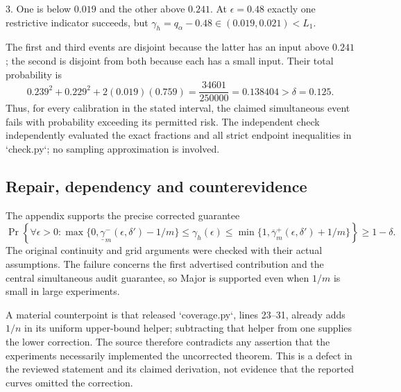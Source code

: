 \documentclass[10pt]{article}
\begin{document}
3. One is below \(0.019\) and the other above \(0.241\). At \(\epsilon=0.48\) exactly one restrictive indicator succeeds, but \(\gamma_h=q_\alpha-0.48\in(0.019,0.021)<L_1\).\par
The first and third events are disjoint because the latter has an input above \(0.241\); the second is disjoint from both because each has a small input. Their total probability is \[0.239^2+0.229^2+2(0.019)(0.759)
=\frac{34601}{250000}=0.138404>\delta=0.125.\] Thus, for every calibration in the stated interval, the claimed simultaneous event fails with probability exceeding its permitted risk. The independent check independently evaluated the exact fractions and all strict endpoint inequalities in `check.py`; no sampling approximation is involved.\par
\subsection*{Repair, dependency and counterevidence}
The appendix supports the precise corrected guarantee \[\Pr\!\left\{\forall\epsilon>0:
 \max\{0,\underline\gamma_m^-(\epsilon,\delta')-1/m\}
 \le\gamma_h(\epsilon)
 \le\min\{1,\overline\gamma_m^+(\epsilon,\delta')+1/m\}\right\}
 \ge1-\delta.\] The original continuity and grid arguments were checked with their actual assumptions. The failure concerns the first advertised contribution and the central simultaneous audit guarantee, so Major is supported even when \(1/m\) is small in large experiments.\par
A material counterpoint is that released `coverage.py`, lines 23–31, already adds \(1/n\) in its uniform upper-bound helper; subtracting that helper from one supplies the lower correction. The source therefore contradicts any assertion that the experiments necessarily implemented the uncorrected theorem. This is a defect in the reviewed statement and its claimed derivation, not evidence that the reported curves omitted the correction.\par
\end{document}
